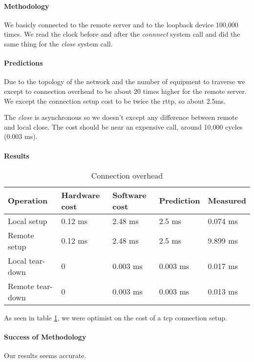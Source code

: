 \paragraph{Methodology}
We basicly connected to the remote server and to the loopback device 100,000 times.
We read the clock before and after the \emph{connnect} system call and did the
same thing for the \emph{close} system call.

\paragraph{Predictions}
Due to the topology of the network and the number of equipment to traverse we
except to connection overhead to be about 20 times higher for the remote server.
We except the connection setup cost to be twice the rttp, so about 2.5ms.

The \emph{close} is asynchronous so we doesn't except any difference between
remote and local close.
The cost should be near an expensive call, around 10,000 cycles (0.003 ms).

\paragraph{Results}

\begin{table} [h]
\begin{center}
\begin{tabular}{| l | l | l | l | l |}
\hline
Operation & Hardware cost & Software cost & Prediction & Measured \\ \hline
Local setup 	&  0.12 ms	& 2.48 ms	&  2.5 ms & 0.074 ms \\ \hline
Remote setup	&  0.12 ms	& 2.48 ms	&  2.5 ms&  9.899 ms \\ \hline
Local tear-down 	&  0	& 0.003 ms	&  0.003 ms&  0.017 ms \\ \hline
Remote tear-down	&  0	& 0.003 ms	&  0.003 ms&  0.013 ms \\ \hline



\end{tabular}
\end{center}
\caption{Connection overhead\label{tab:connection-overhead}}
\end{table}

As seen in table \ref{tab:connection-overhead}, we were optimist on the cost of
a tcp connection setup.

\paragraph{Success of Methodology}
Our results seems accurate.

